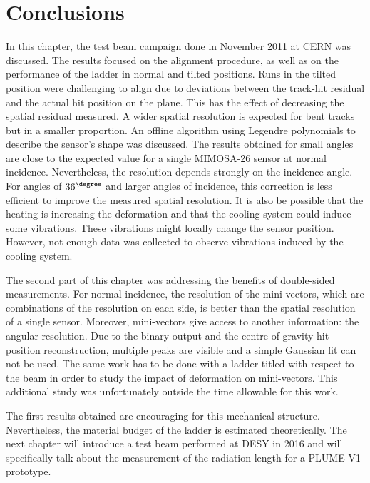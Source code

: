   \section{Conclusions}

  In this chapter, the test beam campaign done in November 2011 at \gls{CERN} was discussed. 
  The results focused on the alignment procedure, as well as on the performance of the ladder in normal and tilted positions.
  Runs in the tilted position were challenging to align due to deviations between the track-hit residual and the actual hit position on the plane.
  This has the effect of decreasing the spatial residual measured.
  A wider spatial resolution is expected for bent tracks but in a smaller proportion.
  An offline algorithm using Legendre polynomials to describe the sensor's shape was discussed.
  The results obtained for small angles are close to the expected value for a single \gls{MIMOSA}-26 sensor at normal incidence. 
  Nevertheless, the resolution depends strongly on the incidence angle.
  For angles of $36^{\degree}$ and larger angles of incidence, this correction is less efficient to improve the measured spatial resolution.
  It is also be possible that the heating is increasing the deformation and that the cooling system could induce some vibrations.
  These vibrations might locally change the sensor position.
  However, not enough data was collected to observe vibrations induced by the cooling system.

  The second part of this chapter was addressing the benefits of double-sided measurements.
  For normal incidence, the resolution of the mini-vectors, which are combinations of the resolution on each side, is better than the spatial resolution of a single sensor.
  Moreover, mini-vectors give access to another information: the angular resolution.
  Due to the binary output and the centre-of-gravity hit position reconstruction, multiple peaks are visible and a simple Gaussian fit can not be used. 
  The same work has to be done with a ladder titled with respect to the beam in order to study the impact of deformation on mini-vectors.
  This additional study was unfortunately outside the time allowable for this work.

  The first results obtained are encouraging for this mechanical structure.
  Nevertheless, the material budget of the ladder is estimated theoretically.
  The next chapter will introduce a test beam performed at \gls{DESY} in 2016 and will specifically talk about the measurement of the radiation length for a \gls{PLUME}-V1 prototype.

